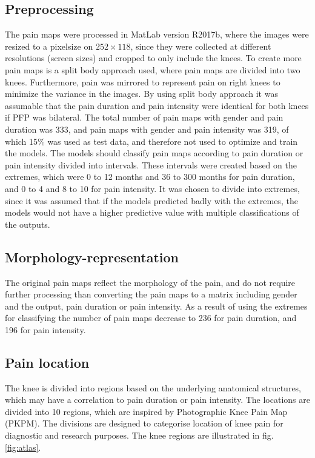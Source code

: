 \subsection*{\textbf{Preprocessing}}
The pain maps were processed in MatLab version R2017b, where the images were resized to a pixelsize on $252 \times 118$, since they were collected at different resolutions (screen sizes) and cropped to only include the knees. To create more pain maps is a split body approach used, where pain maps are divided into two knees. Furthermore, pain was mirrored to represent pain on right knees to minimize the variance in the images. By using split body approach it was assumable that the pain duration and pain intensity were identical for both knees if PFP was bilateral. The total number of pain maps with gender and pain duration was 333, and pain maps with gender and pain intensity was 319, of which 15\% was used as test data, and therefore not used to optimize and train the models. \newline
\noindent
The models should classify pain maps according to pain duration or pain intensity divided into intervals. These intervals were created based on the extremes, which were 0 to 12 months and 36 to 300 months for pain duration, and 0 to 4 and 8 to 10 for pain intensity. It was chosen to divide into extremes, since it was assumed that
if the models predicted badly with the extremes, the models would not have a higher predictive value with multiple classifications of the outputs.

\subsection*{\textbf{Morphology-representation}}
The original pain maps reflect the morphology of the pain, and do not require further processing than converting the pain maps to a matrix including gender and the output, pain duration or pain intensity. As a result of using the extremes for classifying the number of pain maps decrease to 236 for pain duration, and 196 for pain intensity.

\subsection*{\textbf{Pain location}} 
The knee is divided into regions based on the underlying anatomical structures, which may have a correlation to pain duration or pain intensity.
The locations are divided into 10 regions, which are inspired by Photographic Knee Pain Map (PKPM). The divisions are designed to categorise location of knee pain for diagnostic and research purposes.\citep{Elson2010} The knee regions are illustrated in fig. \ref{fig:atlas}.

